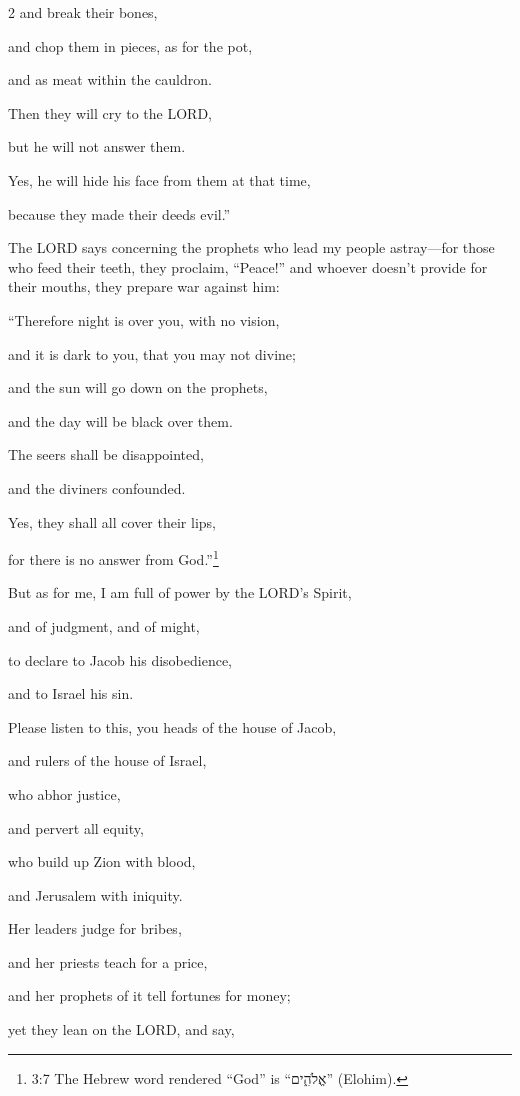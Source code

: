 \begin{multicols}{2}
and break their bones,

and chop them in pieces, as for the pot,

and as meat within the cauldron.

\myverse{}Then they will cry to the LORD,

but he will not answer them.

Yes, he will hide his face from them at that time,

because they made their deeds evil.”

\myverse{}The LORD says concerning the prophets who lead my people astray—for
those who feed their teeth, they proclaim, “Peace!” and whoever doesn’t provide for their mouths, they
prepare war against him:

\myverse{}“Therefore night is over you, with no vision,

and it is dark to you, that you may not divine;

and the sun will go down on the prophets,

and the day will be black over them.

\myverse{}The seers shall be disappointed,

and the diviners confounded.

Yes, they shall all cover their lips,

for there is no answer from God.”\footnote{3:7 The Hebrew word rendered “God” is “אֱלֹהִ֑ים” (Elohim).}

\myverse{}But as for me, I am full of power by the LORD’s Spirit,

and of judgment, and of might,

to declare to Jacob his disobedience,

and to Israel his sin.

\myverse{}Please listen to this, you heads of the house of Jacob,

and rulers of the house of Israel,

who abhor justice,

and pervert all equity,

\myverse{}who build up Zion with blood,

and Jerusalem with iniquity.

\myverse{}Her leaders judge for bribes,

and her priests teach for a price,

and her prophets of it tell fortunes for money;

yet they lean on the LORD, and say,


\end{multicols}
